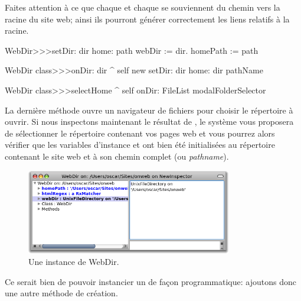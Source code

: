 \documentclass[a4paper,10pt,twoside]{book}
\begin{document}
Faites attention à ce que chaque  et chaque 
se souviennent du chemin vers la racine du site web; ainsi ils
pourront générer correctement les liens relatifs à la racine.


\begin{code}{}
WebDir>>>setDir: dir home: path 
	webDir := dir.
	homePath := path

WebDir class>>>onDir: dir
	^ self new setDir: dir home: dir pathName

WebDir class>>>selectHome
	^ self onDir: FileList modalFolderSelector
\end{code}

La dernière méthode ouvre un navigateur de fichiers pour choisir le
répertoire à ouvrir.
Si nous inspectons maintenant le résultat de ,
le système vous proposera de sélectionner le répertoire contenant vos
pages web et vous pourrez alors vérifier que les variables d'instance
  et  ont bien été initialisées au répertoire
 contenant le site web et à son chemin complet (ou \emph{pathname}).

\begin{figure}[tbh]
\begin{center}
\includegraphics[width=0.8\textwidth]{aWebDir}
\caption{Une instance de WebDir.}
\end{center}
\end{figure}

Ce serait bien de pouvoir instancier un  de façon
programmatique: ajoutons donc une autre méthode de création.

\end{document}
